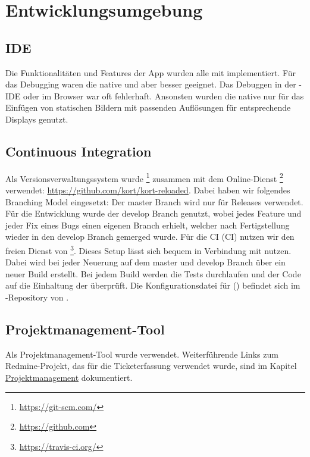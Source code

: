 \chapter{Entwicklungsumgebung}
\label{pd-entwicklungsumgebung}
\section{IDE}
Die Funktionalitäten und Features der App wurden alle mit  implementiert. 
Für das Debugging waren die native   und  aber besser geeignet. 
Das Debuggen in der -\gls{IDE} oder im  Browser war oft fehlerhaft. 
Ansonsten wurden die native  nur für das Einfügen von statischen Bildern mit passenden Auflösungen für entsprechende Displays genutzt. 


\section{Continuous Integration}
Als Versionsverwaltungssystem wurde \footnote{\url{https://git-scm.com/}} zusammen mit dem Online-Dienst \footnote{\url{https://github.com}} verwendet: \url{https://github.com/kort/kort-reloaded}.
Dabei haben wir folgendes Branching Model eingesetzt: Der master Branch wird nur für Releases verwendet.
Für die Entwicklung wurde der develop Branch genutzt, wobei jedes Feature und jeder Fix eines Bugs einen eigenen Branch erhielt, welcher nach Fertigstellung wieder in den develop Branch gemerged wurde.\newline
\newline
Für die \gls{CI} (CI) nutzen wir den freien Dienst von \footnote{\url{https://travis-ci.org/}}.
Dieses Setup lässt sich bequem in Verbindung mit  nutzen. 
Dabei wird bei jeder Neuerung auf dem master und develop Branch über  ein neuer Build erstellt.
Bei jedem Build werden die Tests durchlaufen und der Code auf die Einhaltung der  überprüft.\newline
Die Konfigurationsdatei für  () befindet sich im -Repository von \kort{}.

\section{Projektmanagement-Tool}
Als Projektmanagement-Tool wurde  verwendet. 
Weiterführende Links zum Redmine-Projekt, das für die Ticketerfassung verwendet wurde, sind im Kapitel \hyperref[pm-projektmanagement]{Projektmanagement} dokumentiert.



